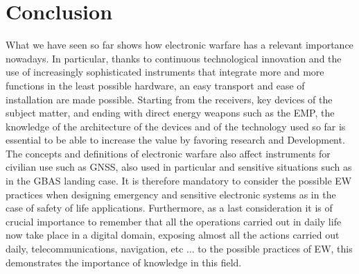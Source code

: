 \documentclass[12pt]{report}
\begin{document}
\section{Conclusion}
What we have seen so far shows how electronic warfare has a relevant importance nowadays. In particular, thanks to continuous technological innovation and the use of increasingly sophisticated instruments that integrate more and more functions in the least possible hardware, an easy transport and ease of installation are made possible. Starting from the receivers, key devices of the subject matter, and ending with direct energy weapons such as the EMP, the knowledge of the architecture of the devices and of the technology used so far is essential to be able to increase the value by favoring research and Development. The concepts and definitions of electronic warfare also affect instruments for civilian use such as GNSS, also used in particular and sensitive situations such as in the GBAS landing case. It is therefore mandatory to consider the possible EW practices when designing emergency and sensitive electronic systems as in the case of safety of life applications. Furthermore, as a last consideration it is of crucial importance to remember that all the operations carried out in daily life now take place in a digital domain, exposing almost all the actions carried out daily, telecommunications, navigation, etc ... to the possible practices of EW, this demonstrates the importance of knowledge in this field.

\listoffigures


\end{document}
